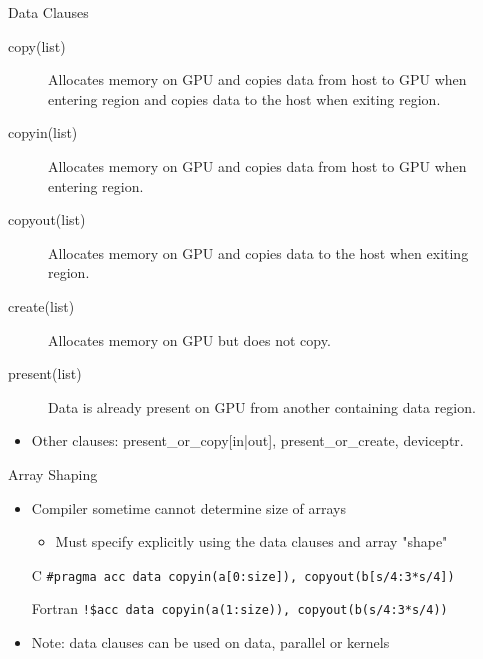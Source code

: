 \documentclass[c,mathserif,compress,xcolor=svgnames]{beamer}
\begin{document}
\begin{frame}{\small Data Clauses}
  \begin{description}
    \item[copy(list)] Allocates memory on GPU and copies data from host to GPU when entering region and copies data to the host when exiting region.
    \item[copyin(list)] Allocates memory on GPU and copies data from host to GPU when entering region.
    \item[copyout(list)] Allocates memory on GPU and copies data to the host when exiting region.
    \item[create(list)] Allocates memory on GPU but does not copy.
    \item[present(list)] Data is already present on GPU from another containing data region.
  \end{description}
  \begin{itemize}
    \item Other clauses: {\color{tigerspurple}present\_or\_copy[in|out]}, {\color{tigerspurple}present\_or\_create}, {\color{tigerspurple}deviceptr}.
  \end{itemize}
\end{frame}

\begin{frame}{\small Array Shaping}
  \begin{itemize}
    \item Compiler sometime cannot determine size of arrays
    \begin{itemize}
      \item Must specify explicitly using the data clauses and array "shape"
    \end{itemize}
    \item[C] \texttt{\#pragma acc data copyin(a[0:size]), copyout(b[s/4:3*s/4])}
    \item[Fortran] \texttt{!\$acc data copyin(a(1:size)), copyout(b(s/4:3*s/4))}
    \item Note: data clauses can be used on data, parallel or kernels
  \end{itemize}
\end{frame}
\end{document}
